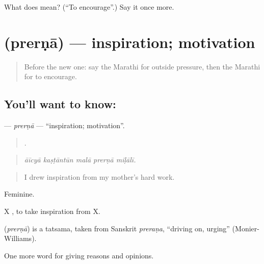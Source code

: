 \begin{tcolorbox}[breakable,colback=teal!4,colframe=teal!35!black,title={Before you move on}]
What does   mean? (\textquotedblleft{}To encourage\textquotedblright{}.) Say it once more.
\end{tcolorbox}
\section[\texorpdfstring{\mr{प्रेरणा} (prerṇā)}{प्रेरणा (prerṇā)}]{ (prerṇā) — inspiration; motivation}

\label{lesson:MR-C377-prerna}



\begin{quote}
Before the new one: say the Marathi for outside pressure, then the Marathi for to encourage.
\end{quote}

\subsection*{You'll want to know: }
\textbf{} — \emph{prerṇā} — \textquotedblleft{}inspiration; motivation\textquotedblright{}.

\begin{quote}
    .
\end{quote}

\begin{quote}
\emph{āīcyā kaṣṭāntūn malā prerṇā miḷālī.}
\end{quote}

\begin{quote}
I drew inspiration from my mother's hard work.
\end{quote}

Feminine.

X   , to take inspiration from X.

\begin{cousinweb}
\textbf{} (\emph{prerṇā}) is a tatsama, taken from Sanskrit \emph{preraṇa}, \textquotedblleft{}driving on, urging\textquotedblright{} (Monier-Williams).
\end{cousinweb}

\begin{grammarlens}[title={What you've built}]
One more word for giving reasons and opinions.
\end{grammarlens}

